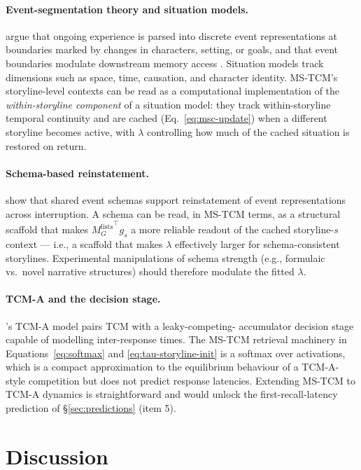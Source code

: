\documentclass[10pt]{article}
\newcommand{\MlistsG}{M^{\mathrm{lists}}_{G}}
\begin{document}
\paragraph{Event-segmentation theory and situation models.}
\citet{ZacSpeSwaBraRey07} argue that ongoing experience is parsed
into discrete event representations at boundaries marked by changes
in characters, setting, or goals, and that event boundaries modulate
downstream memory access \citep{EzzaDav11,HeusMann18,ClewDava17}.
Situation models \citep{ZwaaRadv98} track dimensions such as space,
time, causation, and character identity. MS-TCM's storyline-level
contexts can be read as a computational implementation of the
\emph{within-storyline component} of a situation model: they track
within-storyline temporal continuity and are cached
(Eq.~\ref{eq:msc-update}) when a different storyline becomes active,
with $\lambda$ controlling how much of the cached situation is
restored on return.

\paragraph{Schema-based reinstatement.}
\citet{BaldEtal18} show that shared event schemas support
reinstatement of event representations across interruption. A
schema can be read, in MS-TCM terms, as a structural scaffold that
makes ${\MlistsG}^{\top} g_s$ a more reliable readout of the cached
storyline-$s$ context --- i.e., a scaffold that makes $\lambda$
effectively larger for schema-consistent storylines. Experimental
manipulations of schema strength (e.g., formulaic vs.\ novel
narrative structures) should therefore modulate the fitted $\lambda$.

\paragraph{TCM-A and the decision stage.}
\citet{SedeEtal08}'s TCM-A model pairs TCM with a leaky-competing-
accumulator decision stage capable of modelling inter-response times.
The MS-TCM retrieval machinery in Equations~\ref{eq:softmax} and
\ref{eq:tau-storyline-init} is a softmax over activations, which is
a compact approximation to the equilibrium behaviour of a
TCM-A-style competition but does not predict response latencies.
Extending MS-TCM to TCM-A dynamics is straightforward and would
unlock the first-recall-latency prediction of
\S\ref{sec:predictions} (item 5).

\section{Discussion}
\label{sec:discussion}
\end{document}
